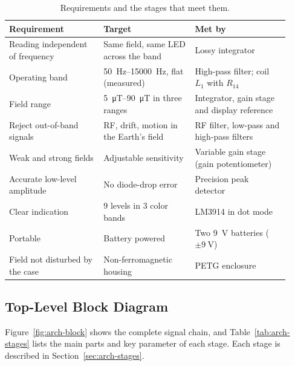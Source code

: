 \documentclass[11pt,a4paper]{article}
\begin{document}
\begin{table}[htbp]
  \centering
  \caption{Requirements and the stages that meet them.}
  \label{tab:arch-req}
  \small
  \begin{tabular}{@{}P{0.31\linewidth}P{0.30\linewidth}P{0.31\linewidth}@{}}
    \toprule
    Requirement & Target & Met by \\
    \midrule
    Reading independent of frequency & Same field, same LED across the band & Lossy integrator \\
    Operating band & \SIrange{50}{15000}{\hertz}, flat (measured) & High-pass filter; coil $L_1$ with $R_{14}$ \\
    Field range & \SIrange{5}{90}{\micro\tesla} in three ranges & Integrator, gain stage and display reference \\
    Reject out-of-band signals & RF, drift, motion in the Earth's field & RF filter, low-pass and high-pass filters \\
    Weak and strong fields & Adjustable sensitivity & Variable gain stage (gain potentiometer) \\
    Accurate low-level amplitude & No diode-drop error & Precision peak detector \\
    Clear indication & 9 levels in 3 color bands & LM3914 in dot mode \\
    Portable & Battery powered & Two \SI{9}{\volt} batteries ($\pm\SI{9}{\volt}$) \\
    Field not disturbed by the case & Non-ferromagnetic housing & PETG enclosure \\
    \bottomrule
  \end{tabular}
\end{table}

\subsection{Top-Level Block Diagram}
\label{sec:arch-block}

Figure~\ref{fig:arch-block} shows the complete signal chain, and Table~\ref{tab:arch-stages} lists the main parts and key parameter of each stage. Each stage is described in Section~\ref{sec:arch-stages}.
\end{document}
